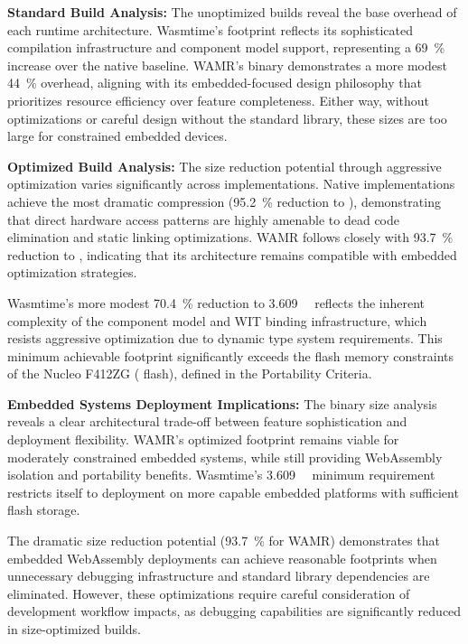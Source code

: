 \textbf{Standard Build Analysis:} The unoptimized builds reveal the base overhead of each runtime architecture. Wasmtime's  footprint reflects its sophisticated compilation infrastructure and component model support, representing a \SI[round-precision=1]{69}{\percent} increase over the native baseline. WAMR's  binary demonstrates a more modest \SI[round-precision=1]{44}{\percent} overhead, aligning with its embedded-focused design philosophy that prioritizes resource efficiency over feature completeness. Either way, without optimizations or careful design without the standard library, these sizes are too large for constrained embedded devices.

\textbf{Optimized Build Analysis:} The size reduction potential through aggressive optimization varies significantly across implementations. Native implementations achieve the most dramatic compression (\SI[round-precision=1]{95.2}{\percent} reduction to ), demonstrating that direct hardware access patterns are highly amenable to dead code elimination and static linking optimizations. WAMR follows closely with \SI[round-precision=1]{93.7}{\percent} reduction to , indicating that its architecture remains compatible with embedded optimization strategies.

Wasmtime's more modest \SI[round-precision=1]{70.4}{\percent} reduction to \SI{3.609}{\mega\byte} reflects the inherent complexity of the component model and WIT binding infrastructure, which resists aggressive optimization due to dynamic type system requirements. This minimum achievable footprint significantly exceeds the flash memory constraints of the Nucleo F412ZG ( flash), defined in the Portability Criteria.

\textbf{Embedded Systems Deployment Implications:} The binary size analysis reveals a clear architectural trade-off between feature sophistication and deployment flexibility. WAMR's optimized  footprint remains viable for moderately constrained embedded systems, while still providing WebAssembly isolation and portability benefits. Wasmtime's \SI{3.609}{\mega\byte} minimum requirement restricts itself to deployment on more capable embedded platforms with sufficient flash storage.

The dramatic size reduction potential (\SI[round-precision=1]{93.7}{\percent} for WAMR) demonstrates that embedded WebAssembly deployments can achieve reasonable footprints when unnecessary debugging infrastructure and standard library dependencies are eliminated. However, these optimizations require careful consideration of development workflow impacts, as debugging capabilities are significantly reduced in size-optimized builds.